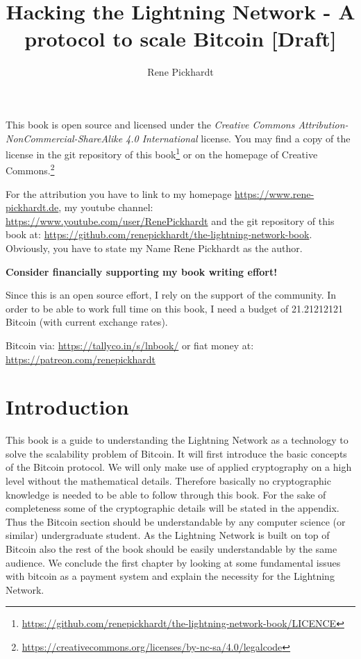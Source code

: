 \documentclass[ebook,12pt,oneside,openany]{memoir}
\title{Hacking the Lightning Network - A protocol to scale Bitcoin [Draft]}
\author{Rene Pickhardt}
\begin{document}
\maketitle

\newpage
This book is open source and licensed under the \textit{Creative Commons Attribution-NonCommercial-ShareAlike 4.0 International} license. You may find a copy of the license in the git repository of this book\footnote{\url{https://github.com/renepickhardt/the-lightning-network-book/LICENCE}} or on the homepage of Creative Commons.\footnote{\url{https://creativecommons.org/licenses/by-nc-sa/4.0/legalcode}}

For the attribution you have to link to my homepage \url{https://www.rene-pickhardt.de}, my youtube channel: \url{https://www.youtube.com/user/RenePickhardt} and the git repository of this book at: \url{https://github.com/renepickhardt/the-lightning-network-book}. Obviously, you have to state my Name Rene Pickhardt as the author.

\textbf{Consider financially supporting my book writing effort!}

Since this is an open source effort, I rely on the support of the community. In order to be able to work full time on this book, I need a budget of 21.21212121 Bitcoin (with current exchange rates).

Bitcoin via: \url{https://tallyco.in/s/lnbook/} or fiat money at:  \url{https://patreon.com/renepickhardt}


\newpage
\tableofcontents
\newpage

\newcommand{\problem}[1]{\textbf{Problem: #1}}
\newcommand{\todo}[1]{\textcolor{blue}{\textbf{TODO}: #1}}

\newtheorem{theorem}{Theorem}[chapter]
\newtheorem{lemma}{Lemma}[chapter]
\theoremstyle{remark}
\newtheorem{remark}{Remark}[chapter]
\theoremstyle{definition}
\newtheorem{definition}{Definition}[chapter]
\theoremstyle{remark}
\newtheorem{example}{Example}[chapter]

\chapter{Introduction}
This book is a guide to understanding the Lightning Network as a technology to solve the scalability problem of Bitcoin.
It will first introduce the basic concepts of the Bitcoin protocol.
We will only make use of applied cryptography on a high level without the mathematical details.
Therefore basically no cryptographic knowledge is needed to be able to follow through this book.
For the sake of completeness some of the cryptographic details will be stated in the appendix.
Thus the Bitcoin section should be understandable by any computer science (or similar) undergraduate student.
As the Lightning Network is built on top of Bitcoin also the rest of the book should be easily understandable by the same audience.
We conclude the first chapter by looking at some fundamental issues with bitcoin as a payment system and explain the necessity for the Lightning Network.
\end{document}
